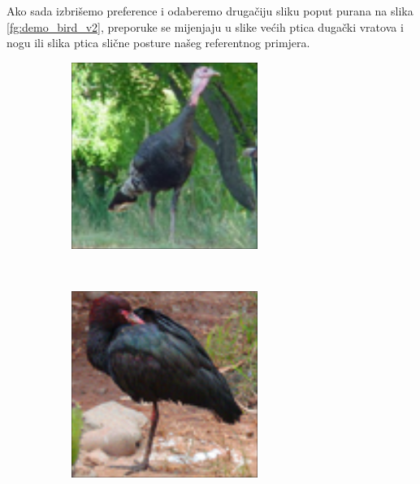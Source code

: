 \documentclass[times, utf8, proizvoljni, numeric]{fer}
\newcommand{\rulesep}{\unskip\ \vrule\ }
\begin{document}
Ako sada izbrišemo preference i odaberemo drugačiju sliku poput purana na slika \ref{fg:demo_bird_v2}, preporuke se mijenjaju u slike većih ptica dugački vratova i nogu ili slika ptica slične posture našeg referentnog primjera. 

\begin{figure}[ht!]
	\begin{subfigure}[t]{0.24\textwidth}
		\includegraphics[width=\textwidth,height=\textwidth ]{./imgs/demo-preporucitelja-po-sadrzaju/tijek-rada/id@2.png}
	\end{subfigure}
	\rulesep
	\begin{subfigure}[t]{0.24\textwidth}
		\includegraphics[width=\textwidth,height=\textwidth]{./imgs/demo-preporucitelja-po-sadrzaju/tijek-rada/id@148.png}

\end{subfigure}
\end{figure}
\end{document}
